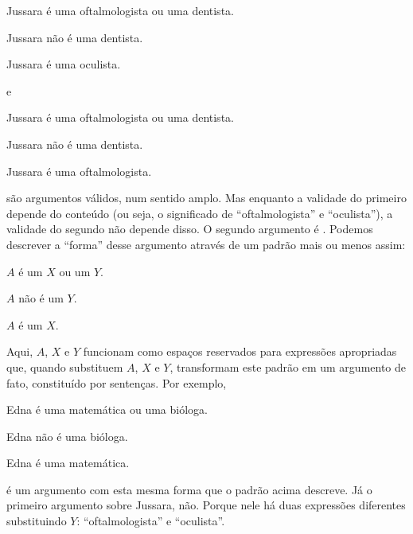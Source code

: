 \begin{earg}
	\item[] Jussara é uma oftalmologista ou uma dentista.
	\item[] Jussara não é uma dentista.
	\item[\therefore] Jussara é uma oculista.
\end{earg}
e
\begin{earg}
	\item[] Jussara é uma oftalmologista ou uma dentista.
	\item[] Jussara não é uma dentista.
	\item[\therefore] Jussara é uma oftalmologista.
\end{earg}
são argumentos válidos, num sentido amplo. Mas enquanto a validade do primeiro depende do conteúdo (ou seja, o significado de ``oftalmologista'' e ``oculista''), a validade do segundo não depende disso.
O segundo argumento é .
Podemos descrever a ``forma'' desse argumento através de um padrão mais ou menos assim:
\begin{earg}
	\item[] $A$ é um $X$ ou um $Y$.
	\item[] $A$ não é um $Y$.
	\item[\therefore] $A$ é um $X$.
\end{earg}
Aqui, $A$, $X$ e $Y$ funcionam como espaços reservados para expressões apropriadas que, quando substituem $A$, $X$ e $Y$, transformam este padrão em um argumento de fato, constituído por sentenças.
Por exemplo,
\begin{earg}
	\item[] Edna é uma matemática ou uma bióloga.
	\item[] Edna não é uma bióloga.
	\item[\therefore] Edna é uma matemática.
\end{earg}
é um argumento com esta mesma forma que o padrão acima descreve.
Já o primeiro argumento sobre Jussara, não.
Porque nele há duas expressões diferentes substituindo $Y$: ``oftalmologista'' e ``oculista''.

